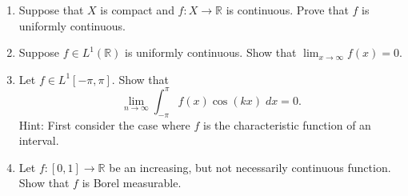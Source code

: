 \documentclass[12pt]{article}
\def\ra{\rightarrow}
\def\Reals{{\mathbb R}}
\begin{document}
\begin{enumerate}
\item Suppose that $X$ is compact and $f:X\ra \Reals$ is continuous.  Prove that $f$ is 
uniformly continuous.

\item Suppose $f\in L^1(\Reals)$ is uniformly continuous.  Show that $\lim_{x\ra\infty}f(x)=0$.

\item 
Let $f\in L^1[-\pi,\pi]$.  Show that
$$
\lim_{n\ra\infty} \int_{-\pi}^\pi f(x)\cos(kx)\; dx = 0.
$$
Hint: First consider the case where $f$ is the characteristic function of
an interval.

\item Let $f:[0,1]\ra \Reals$ be an increasing, but not necessarily
continuous function.  Show that $f$ is Borel measurable.

\end{enumerate}
\end{document}
